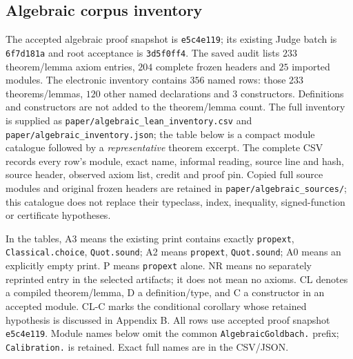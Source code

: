 \subsection{Algebraic corpus inventory}
The accepted algebraic proof snapshot is \texttt{e5c4e119}; its existing
Judge batch is \texttt{6f7d181a} and root acceptance is \texttt{3d5f0ff4}.
The saved audit lists $233$ theorem/lemma axiom entries, $204$ complete frozen
headers and $25$ imported modules. The electronic inventory contains $356$
named rows: those $233$ theorems/lemmas, $120$ other named declarations and
$3$ constructors. Definitions and constructors are not added to the
theorem/lemma count.
The full inventory is supplied as \nolinkurl{paper/algebraic_lean_inventory.csv}
and \nolinkurl{paper/algebraic_inventory.json}; the table below is a compact
module catalogue followed by a \emph{representative} theorem excerpt.
The complete CSV records every row's module, exact name, informal reading,
source line and hash, source header, observed axiom list, credit and proof pin.
Copied full source modules and original frozen headers are retained in
\nolinkurl{paper/algebraic_sources/}; this catalogue does not replace their
typeclass, index, inequality, signed-function or certificate hypotheses.

In the tables, A3 means the existing print contains exactly
\texttt{propext}, \texttt{Classical.choice}, \texttt{Quot.sound}; A2 means
\texttt{propext}, \texttt{Quot.sound}; A0 means an explicitly empty print.
P means \texttt{propext} alone.
NR means no separately reprinted entry in the selected artifacts; it does
not mean no axioms. CL denotes a compiled theorem/lemma, D a definition/type,
and C a constructor in an accepted module. CL-C marks the conditional
corollary whose retained hypothesis is discussed in Appendix B.
All rows use accepted proof snapshot \texttt{e5c4e119}.
Module names below omit the common \texttt{AlgebraicGoldbach.} prefix;
\texttt{Calibration.} is retained. Exact full names are in the CSV/JSON.


